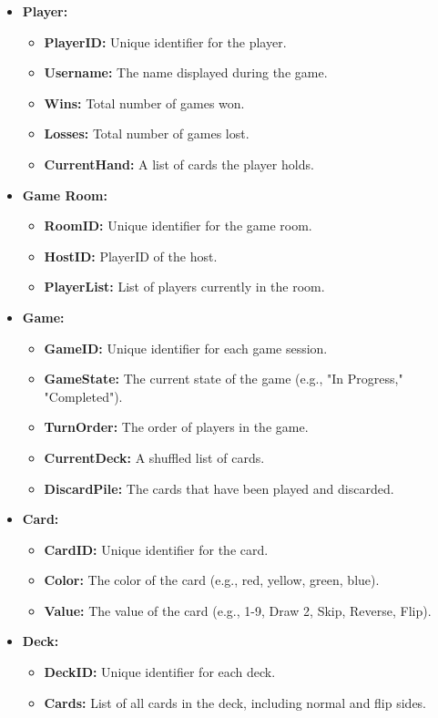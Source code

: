 \documentclass{article}
\begin{document}
\begin{itemize}
    \item \textbf{Player:}
    \begin{itemize}
        \item \textbf{PlayerID:} Unique identifier for the player.
        \item \textbf{Username:} The name displayed during the game.
        \item \textbf{Wins:} Total number of games won.
        \item \textbf{Losses:} Total number of games lost.
        \item \textbf{CurrentHand:} A list of cards the player holds.
    \end{itemize}
    \item \textbf{Game Room:}
    \begin{itemize}
        \item \textbf{RoomID:} Unique identifier for the game room.
        \item \textbf{HostID:} PlayerID of the host.
        \item \textbf{PlayerList:} List of players currently in the room.
    \end{itemize}
    \item \textbf{Game:}
    \begin{itemize}
        \item \textbf{GameID:} Unique identifier for each game session.
        \item \textbf{GameState:} The current state of the game (e.g., "In Progress," "Completed").
        \item \textbf{TurnOrder:} The order of players in the game.
        \item \textbf{CurrentDeck:} A shuffled list of cards.
        \item \textbf{DiscardPile:} The cards that have been played and discarded.
    \end{itemize}
    \item \textbf{Card:}
    \begin{itemize}
        \item \textbf{CardID:} Unique identifier for the card.
        \item \textbf{Color:} The color of the card (e.g., red, yellow, green, blue).
        \item \textbf{Value:} The value of the card (e.g., 1-9, Draw 2, Skip, Reverse, Flip).
    \end{itemize}
    \item \textbf{Deck:}
    \begin{itemize}
        \item \textbf{DeckID:} Unique identifier for each deck.
        \item \textbf{Cards:} List of all cards in the deck, including normal and flip sides.
    \end{itemize}
\end{itemize}
\end{document}
